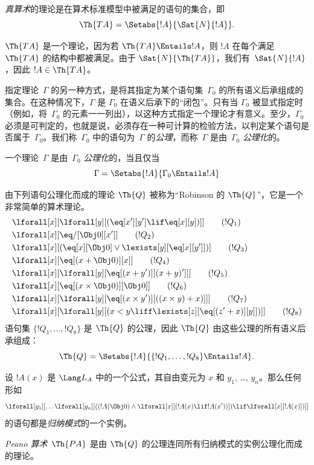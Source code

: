 \documentclass[../../../include/open-logic-section]{subfiles}
\begin{document}
\begin{defn}
\emph{真算术}的理论是在算术标准模型中被满足的语句的集合，即
\[
\Th{TA} = \Setabs{!A}{\Sat{N}{!A}}.
\]
\end{defn}

$\Th{TA}$ 是一个理论，因为若 $\Th{TA} \Entails !A$，则 $!A$ 在每个满足~$\Th{TA}$ 的结构中都被满足。由于 $\Sat{N}{\Th{TA}}$，我们有~$\Sat{N}{!A}$，因此 $!A \in \Th{TA}$。

指定理论~$\Gamma$ 的另一种方式，是将其指定为某个语句集~$\Gamma_0$ 的所有语义后承组成的集合。在这种情况下，$\Gamma$ 是 $\Gamma_0$ 在语义后承下的“闭包”。只有当 $\Gamma_0$ 被显式指定时（例如，将~$\Gamma_0$ 的元素一一列出），以这种方式指定一个理论才有意义。至少，$\Gamma_0$ 必须是可判定的，也就是说，必须存在一种可计算的检验方法，以判定某个语句是否属于~$\Gamma_0$。我们称~$\Gamma_0$ 中的语句为~$\Gamma$ 的\emph{公理}，而称~$\Gamma$ 是由~$\Gamma_0$ \emph{公理化}的。

\begin{defn}
一个理论~$\Gamma$ 是由~$\Gamma_0$ \emph{公理化}的，当且仅当
\[
\Gamma = \Setabs{!A}{\Gamma_0 \Entails !A}
\]
\end{defn}

\begin{defn}
由下列语句公理化而成的理论 $\Th{Q}$ 被称为“Robinson 的 $\Th{Q}$”，它是一个非常简单的算术理论。
\begin{align*}
& \lforall[x][\lforall[y][(\eq[x'][y'] \lif \eq[x][y])]] \tag{$!Q_1$}\\
& \lforall[x][\eq/[\Obj 0][x']] \tag{$!Q_2$}\\
& \lforall[x][(\eq[x][\Obj 0] \lor \lexists[y][\eq[x][y']])] \tag{$!Q_3$}\\
& \lforall[x][\eq[(x + \Obj 0)][x]] \tag{$!Q_4$}\\
& \lforall[x][\lforall[y][\eq[(x + y')][(x + y)']]] \tag{$!Q_5$}\\
& \lforall[x][\eq[(x \times \Obj 0)][\Obj 0]] \tag{$!Q_6$}\\
& \lforall[x][\lforall[y][\eq[(x \times y')][((x \times y) + x)]]] \tag{$!Q_7$}\\
& \lforall[x][\lforall[y][(x < y \liff \lexists[z][\eq[(z' + x)][y]])]] \tag{$!Q_8$}
\end{align*}
语句集 $\{!Q_1, \dots, !Q_8\}$ 是 $\Th{Q}$ 的公理，因此 $\Th{Q}$ 由这些公理的所有语义后承组成：
\[
\Th{Q} = \Setabs{!A}{\{!Q_1, \dots, !Q_8\} \Entails !A}.
\]
\end{defn}

\begin{defn}
设 $!A(x)$ 是 $\Lang L_A$ 中的一个公式，其自由变元为 $x$ 和 $y_1$, \dots, $y_n$。那么任何形如
\[
\lforall[y_1][\dots\lforall[y_n][((!A(\Obj 0) \land \lforall[x][(!A(x)
\lif !A(x'))]) \lif \lforall[x][!A(x)])]]
\]
的语句都是\emph{归纳模式}的一个实例。

\emph{Peano 算术}~$\Th{PA}$ 是由 $\Th{Q}$ 的公理连同所有归纳模式的实例公理化而成的理论。
\end{defn}
\end{document}
